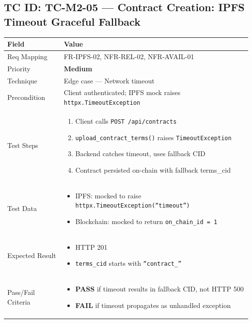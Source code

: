 \documentclass[12pt,a4paper]{article}
\newcommand{\sevmed}{\textcolor{severitymed}{\textbf{Medium}}}
\newcommand{\passresult}{\textcolor{passgreen}{\textbf{PASS}}}
\newcommand{\failresult}{\textcolor{failred}{\textbf{FAIL}}}
\begin{document}
\vspace{0.8cm}

\subsection{TC ID: TC-M2-05 --- Contract Creation: IPFS Timeout Graceful Fallback}

\begin{tabular}{|p{}|p{}|}
\hline
\rowcolor{lightblue} \textbf{Field} & \textbf{Value} \\
\hline
Req Mapping & FR-IPFS-02, NFR-REL-02, NFR-AVAIL-01 \\
\hline
Priority & \sevmed \\
\hline
Technique & Edge case --- Network timeout \\
\hline
Precondition & Client authenticated; IPFS mock raises \texttt{httpx.TimeoutException} \\
\hline
Test Steps &
\begin{enumerate}[nosep, leftmargin=*]
  \item Client calls \texttt{POST /api/contracts}
  \item \texttt{upload\_contract\_terms()} raises \texttt{TimeoutException}
  \item Backend catches timeout, uses fallback CID
  \item Contract persisted on-chain with fallback terms\_cid
\end{enumerate} \\
\hline
Test Data &
\begin{itemize}[nosep, leftmargin=*]
  \item IPFS: mocked to raise \texttt{httpx.TimeoutException(``timeout'')}
  \item Blockchain: mocked to return \texttt{on\_chain\_id = 1}
\end{itemize} \\
\hline
Expected Result &
\begin{itemize}[nosep, leftmargin=*]
  \item HTTP 201
  \item \texttt{terms\_cid} starts with \texttt{``contract\_''}
\end{itemize} \\
\hline
Pass/Fail Criteria &
\begin{itemize}[nosep, leftmargin=*]
  \item \passresult{} if timeout results in fallback CID, not HTTP 500
  \item \failresult{} if timeout propagates as unhandled exception
\end{itemize} \\
\hline
\end{tabular}
\end{document}
